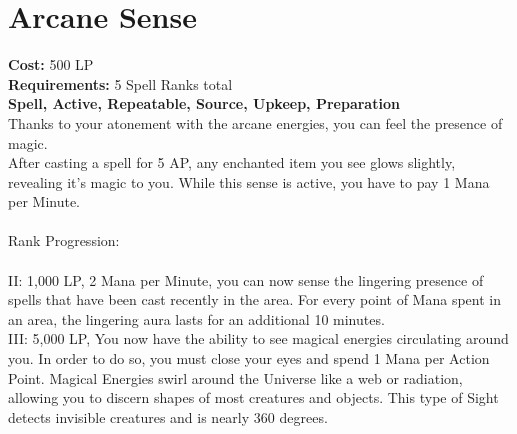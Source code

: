 \section{Arcane Sense}\label{spell:arcaneSense}
\textbf{Cost:} 500 LP\\
\textbf{Requirements:} 5 Spell Ranks total\\
\textbf{Spell, Active, Repeatable, Source, Upkeep, Preparation}\\
Thanks to your atonement with the arcane energies, you can feel the presence of magic.\\
After casting a spell for 5 AP, any enchanted item you see glows slightly, revealing it's magic to you.
While this sense is active, you have to pay 1 Mana per Minute.\\
\\
Rank Progression:\\
\\
II: 1,000 LP, 2 Mana per Minute, you can now sense the lingering presence of spells that have been cast recently in the area.
For every point of Mana spent in an area, the lingering aura lasts for an additional 10 minutes.\\
III: 5,000 LP, You now have the ability to see magical energies circulating around you.
In order to do so, you must close your eyes and spend 1 Mana per Action Point.
Magical Energies swirl around the Universe like a web or radiation, allowing you to discern shapes of most creatures and objects.
This type of Sight detects invisible creatures and is nearly 360 degrees.\\